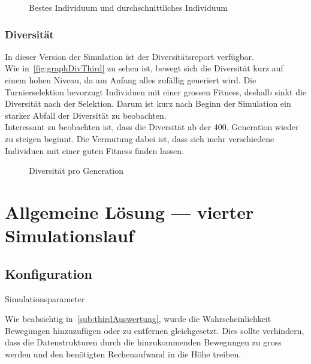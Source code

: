       \begin{figure}[H]
        \centering
        
        \caption{Bestes Individuum und durchschnittliches Individuum\label{fig:graphThird}}
      \end{figure}

      \subsubsection{Diversität}

        In dieser Version der Simulation ist der Diversitätsreport verfügbar.
        \\
        Wie in~\vref{fig:graphDivThird} zu sehen ist, bewegt sich die Diversität kurz auf einem hohen Niveau,
        da am Anfang alles zufällig generiert wird.
        Die Turnierselektion bevorzugt Individuen mit einer grossen Fitness,
        deshalb sinkt die Diversität nach der Selektion.
        Darum ist kurz nach Beginn der Simulation ein starker Abfall der Diversität zu beobachten.
        \\
        Interessant zu beobachten ist, dass die Diversität ab der 400. Generation wieder zu steigen beginnt.
        Die Vermutung dabei ist, dass sich mehr verschiedene Individuen mit einer guten Fitness finden lassen.

        \begin{figure}[H]
          \centering
          
          \caption{Diversität pro Generation\label{fig:graphDivThird}}
        \end{figure}

  \section{Allgemeine Lösung --- vierter Simulationslauf\label{sec:4lauf}}

    \subsection{Konfiguration}

      \begin{table}[H]
        \centering
        
        \caption{Simulationsparameter\label{tbl:forthRunConf}}
      \end{table}

      Wie beabsichtig in~\vref{sub:thirdAuswertung},
      wurde die Wahrscheinlichkeit Bewegungen hinzuzufügen oder zu entfernen gleichgesetzt.
      Dies sollte verhindern, dass die Datenstrukturen durch die hinzukommenden Bewegungen zu gross werden
      und den benötigten Rechenaufwand in die Höhe treiben.

